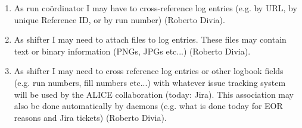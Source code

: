 \documentclass[a4paper,11pt]{book}
\begin{document}
\begin{enumerate}
  \item As run co\"ordinator I may have to cross-reference log entries (e.g. by URL, by unique Reference ID, or by run number)  (Roberto Divia).
  \item  As shifter I may need to attach files to log entries. These files may contain text or binary information (PNGs, JPGs etc...) (Roberto Divia).
  \item As shifter I may need to cross reference log entries or other logbook fields (e.g. run numbers, fill numbers etc...) with whatever issue tracking system will be used by the ALICE collaboration (today: Jira). This association may also be done automatically by daemons (e.g. what is done today for EOR reasons and Jira tickets) (Roberto Divia).

\end{enumerate}
\end{document}
